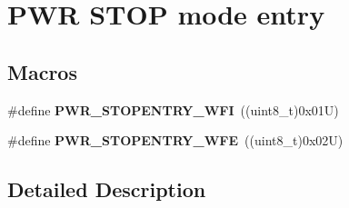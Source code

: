 \hypertarget{group___p_w_r___s_t_o_p__mode__entry}{}\section{P\+WR S\+T\+OP mode entry}
\label{group___p_w_r___s_t_o_p__mode__entry}
\subsection*{Macros}
\begin{DoxyCompactItemize}
\item 
\mbox{\label{group___p_w_r___s_t_o_p__mode__entry_ga3bdb1a9c9b421b73ab148d45eb90fa9b}} 
\#define {\bfseries P\+W\+R\+\_\+\+S\+T\+O\+P\+E\+N\+T\+R\+Y\+\_\+\+W\+FI}~((uint8\+\_\+t)0x01\+U)
\item 
\mbox{\label{group___p_w_r___s_t_o_p__mode__entry_ga2e1ee5c9577cc322474a826fa97de798}} 
\#define {\bfseries P\+W\+R\+\_\+\+S\+T\+O\+P\+E\+N\+T\+R\+Y\+\_\+\+W\+FE}~((uint8\+\_\+t)0x02\+U)
\end{DoxyCompactItemize}


\subsection{Detailed Description}
